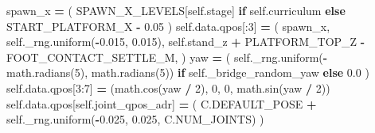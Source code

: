 \documentclass[
  american,
  11pt,
  letterpaper,
]{article}
\newenvironment{Shaded}{\begin{snugshade}}{\end{snugshade}}
\newcommand{\ControlFlowTok}[1]{\textcolor[rgb]{0.13,0.29,0.53}{\textbf{#1}}}
\newcommand{\DecValTok}[1]{\textcolor[rgb]{0.00,0.00,0.81}{#1}}
\newcommand{\FloatTok}[1]{\textcolor[rgb]{0.00,0.00,0.81}{#1}}
\newcommand{\NormalTok}[1]{#1}
\newcommand{\OperatorTok}[1]{\textcolor[rgb]{0.81,0.36,0.00}{\textbf{#1}}}
\newcommand{\VariableTok}[1]{\textcolor[rgb]{0.00,0.00,0.00}{#1}}
\renewenvironment{Shaded}{\par\smallskip}{\par\smallskip}
\begin{document}
\begin{Shaded}
\begin{Highlighting}[]
\NormalTok{        spawn\_x }\OperatorTok{=}\NormalTok{ (}
\NormalTok{            SPAWN\_X\_LEVELS[}\VariableTok{self}\NormalTok{.stage]}
            \ControlFlowTok{if} \VariableTok{self}\NormalTok{.curriculum}
            \ControlFlowTok{else}\NormalTok{ START\_PLATFORM\_X }\OperatorTok{{-}} \FloatTok{0.05}
\NormalTok{        )}
        \VariableTok{self}\NormalTok{.data.qpos[:}\DecValTok{3}\NormalTok{] }\OperatorTok{=}\NormalTok{ (}
\NormalTok{            spawn\_x,}
            \VariableTok{self}\NormalTok{.\_rng.uniform(}\OperatorTok{{-}}\FloatTok{0.015}\NormalTok{, }\FloatTok{0.015}\NormalTok{),}
            \VariableTok{self}\NormalTok{.stand\_z }\OperatorTok{+}\NormalTok{ PLATFORM\_TOP\_Z }\OperatorTok{{-}}\NormalTok{ FOOT\_CONTACT\_SETTLE\_M,}
\NormalTok{        )}
\NormalTok{        yaw }\OperatorTok{=}\NormalTok{ (}
            \VariableTok{self}\NormalTok{.\_rng.uniform(}\OperatorTok{{-}}\NormalTok{math.radians(}\DecValTok{5}\NormalTok{), math.radians(}\DecValTok{5}\NormalTok{))}
            \ControlFlowTok{if} \VariableTok{self}\NormalTok{.\_bridge\_random\_yaw}
            \ControlFlowTok{else} \FloatTok{0.0}
\NormalTok{        )}
        \VariableTok{self}\NormalTok{.data.qpos[}\DecValTok{3}\NormalTok{:}\DecValTok{7}\NormalTok{] }\OperatorTok{=}\NormalTok{ (math.cos(yaw }\OperatorTok{/} \DecValTok{2}\NormalTok{), }\DecValTok{0}\NormalTok{, }\DecValTok{0}\NormalTok{, math.sin(yaw }\OperatorTok{/} \DecValTok{2}\NormalTok{))}
        \VariableTok{self}\NormalTok{.data.qpos[}\VariableTok{self}\NormalTok{.joint\_qpos\_adr] }\OperatorTok{=}\NormalTok{ (}
\NormalTok{            C.DEFAULT\_POSE }\OperatorTok{+} \VariableTok{self}\NormalTok{.\_rng.uniform(}\OperatorTok{{-}}\FloatTok{0.025}\NormalTok{, }\FloatTok{0.025}\NormalTok{, C.NUM\_JOINTS)}
\NormalTok{        )}


\end{Highlighting}
\end{Shaded}
\end{document}
